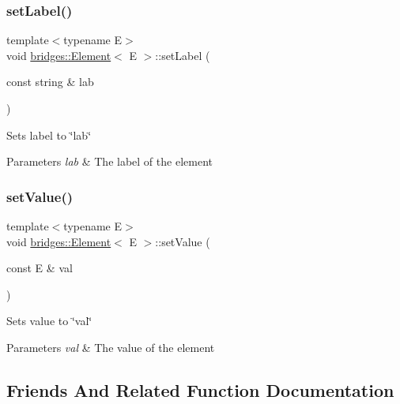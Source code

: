 \subsubsection{\texorpdfstring{set\+Label()}{setLabel()}}
{\footnotesize\ttfamily template$<$typename E$>$ \\
void \mbox{\hyperlink{classbridges_1_1_element}{bridges\+::\+Element}}$<$ E $>$\+::set\+Label (\begin{DoxyParamCaption}\item[{const string \&}]{lab }\end{DoxyParamCaption})\hspace{0.3cm}{\ttfamily [inline]}}

Sets label to \char`\"{}lab\char`\"{}


\begin{DoxyParams}{Parameters}
{\em lab} & The label of the element \\
\hline
\end{DoxyParams}
\mbox{\label{classbridges_1_1_element_a737cb19281b6aa45a5a1dc9d592dad93}} 
\subsubsection{\texorpdfstring{set\+Value()}{setValue()}}
{\footnotesize\ttfamily template$<$typename E$>$ \\
void \mbox{\hyperlink{classbridges_1_1_element}{bridges\+::\+Element}}$<$ E $>$\+::set\+Value (\begin{DoxyParamCaption}\item[{const E \&}]{val }\end{DoxyParamCaption})\hspace{0.3cm}{\ttfamily [inline]}}

Sets value to \char`\"{}val\char`\"{}


\begin{DoxyParams}{Parameters}
{\em val} & The value of the element \\
\hline
\end{DoxyParams}


\subsection{Friends And Related Function Documentation}
\mbox{\label{classbridges_1_1_element_ab1a595168ea1870ce436dfd2d8e69b6d}} 
